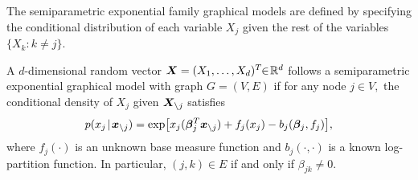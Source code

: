 \documentclass[twoside,11pt]{article}
\newcommand*{\BR}{\mathbb{R}}
\begin{document}
 
The semiparametric exponential family graphical models are defined by specifying the conditional distribution of each variable $X_j$  given the rest of the variables $\{X_k\colon  k\neq j\}$. %
\begin{definition}\label{def::model}
A $d$-dimensional random vector $\bX =(X_1, \ldots, X_d)^T\!\!\in\!\BR^d$  follows a semiparametric exponential graphical model with graph $G=(V,E)$  if for any node $ j \in V,$
 the conditional density of $X_j$ given $\bm{X}_{\setminus j}  $ satisfies
\begin{align}\label{equ::conditional}
p ( x_j \!\mid\! \bm{x}_{\setminus j}) = \exp \bigl [ x_j (\bm{\beta}^T_j \bm{x}_{\setminus j} )+ f_j(x_j)-  b_j(\bm{\beta}_j,f_j)\bigr],
\end{align}
where $f_j(\cdot)$ is an unknown base measure function and $b_j(\cdot,\cdot)$ is a known log-partition function. In particular, $(j,k)\in E$ if and only if $\beta_{jk}\neq 0$. 
\end{definition} 
\end{document}
